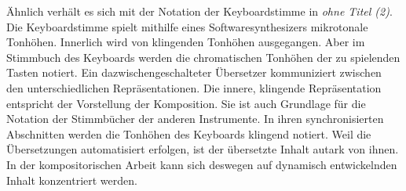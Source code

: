 \documentclass[12pt,a4paper,ngerman]{article}
\begin{document}
Ähnlich verhält es sich mit der Notation der Keyboardstimme in \emph{ohne Titel (2)}.
Die Keyboardstimme spielt mithilfe eines Softwaresynthesizers mikrotonale Tonhöhen.
Innerlich wird von klingenden Tonhöhen ausgegangen.
Aber im Stimmbuch des Keyboards werden die chromatischen Tonhöhen der zu spielenden Tasten notiert.
Ein dazwischengeschalteter Übersetzer kommuniziert zwischen den unterschiedlichen Repräsentationen.
Die innere, klingende Repräsentation entspricht der Vorstellung der Komposition.
Sie ist auch Grundlage für die Notation der Stimmbücher der anderen Instrumente.
In ihren synchronisierten Abschnitten werden die Tonhöhen des Keyboards klingend notiert.
Weil die Übersetzungen automatisiert erfolgen, ist der übersetzte Inhalt autark von ihnen.
In der kompositorischen Arbeit kann sich deswegen auf dynamisch entwickelnden Inhalt konzentriert werden.

% 



\bigskip
\end{document}
